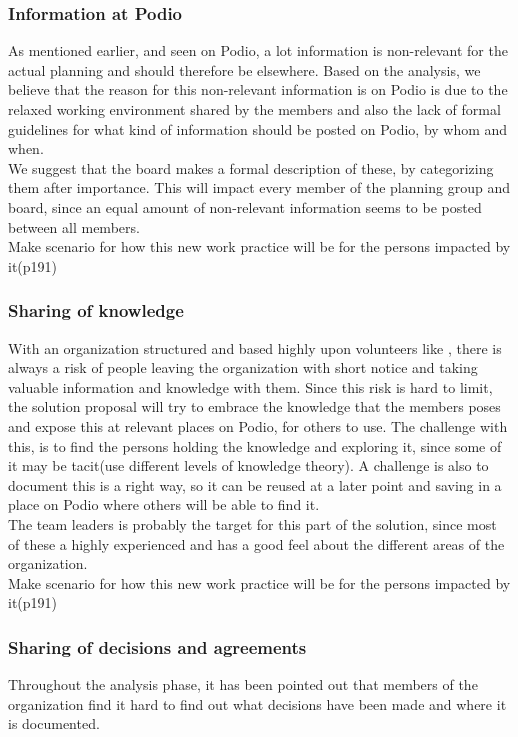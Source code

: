 \subsubsection{Information at Podio}
As mentioned earlier, and seen on Podio, a lot information is non-relevant for the actual planning and should therefore be elsewhere. Based on the analysis, we believe that the reason for this non-relevant information is on Podio is due to the relaxed working environment shared by the members and also the lack of formal guidelines for what kind of information should be posted on Podio, by whom and when.\\ 
We suggest that the board makes a formal description of these, by categorizing them after importance.
This will impact every member of the planning group and board, since an equal amount of non-relevant information seems to be posted between all members. \\
Make scenario for how this new work practice will be for the persons impacted by it(p191)
  
\subsubsection{Sharing of knowledge}
With an organization structured and based highly upon volunteers like \mil, there is always a risk of people leaving the organization with short notice and taking valuable information and knowledge with them. Since this risk is hard to limit, the solution proposal will try to embrace the knowledge that the members poses and expose this at relevant places on Podio, for others to use. The challenge with this, is to find the persons holding the knowledge and exploring it, since some of it may be tacit(use different levels of knowledge theory). A challenge is also to document this is a right way, so it can be reused at a later point and saving in a place on Podio where others will be able to find it.\\
The team leaders is probably the target for this part of the solution, since most of these a highly experienced and has a good feel about the different areas of the organization.\\

Make scenario for how this new work practice will be for the persons impacted by it(p191)

\subsubsection{Sharing of decisions and agreements}
Throughout the analysis phase, it has been pointed out that members of the organization find it hard to find out what decisions have been made and where it is documented. 

